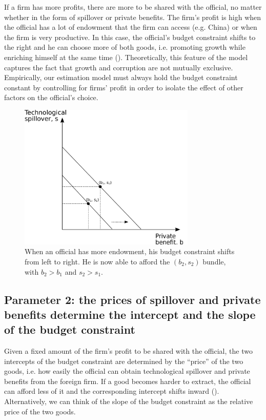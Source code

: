 If a firm has more profits, there are more to be shared with the official, no matter whether in the form of spillover or private benefits. The firm's profit is high when the official has a lot of endowment that the firm can access (e.g. China) or when the firm is very productive. In this case, the official's budget constraint shifts to the right and he can choose more of both goods, i.e. promoting growth while enriching himself at the same time (). Theoretically, this feature of the model captures the fact that growth and corruption are not mutually exclusive. Empirically, our estimation model must always hold the budget constraint constant by controlling for firms' profit in order to isolate the effect of other factors on the official's choice.

\begin{figure}[!ht]
	\centering
    \includegraphics[width=0.75\textwidth, height=0.75\textheight,keepaspectratio]{../figure/budget_constraint}
    \caption{When an official has more endowment, his budget constraint shifts from left to right. He is now able to afford the $(b_2, s_2)$ bundle, with $b_2 > b_1$ and $s_2 > s_1$.}
    \label{fig:budget_constraint}
\end{figure}

\subsection{Parameter 2: the prices of spillover and private benefits determine the intercept and the slope of the budget constraint}
\label{sec:theory_budget_constraint_slope_and_intercept}

Given a fixed amount of the firm's profit to be shared with the official, the two intercepts of the budget constraint are determined by the ``price'' of the two goods, i.e. how easily the official can obtain technological spillover and private benefits from the foreign firm. If a good becomes harder to extract, the official can afford less of it and the corresponding intercept shifts inward (). Alternatively, we can think of the slope of the budget constraint as the relative price of the two goods.

